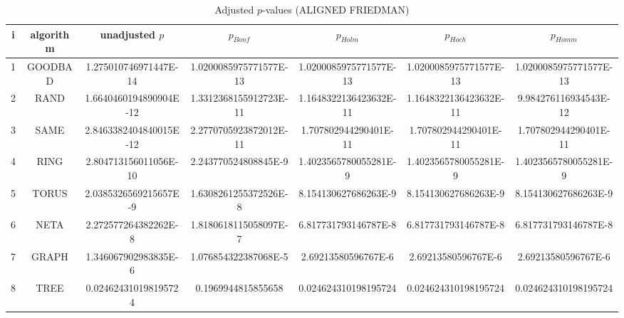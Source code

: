\documentclass[a4paper,10pt]{article}
\begin{document}
\begin{landscape}
\begin{table}[!htp]
\centering\scriptsize
\caption{Adjusted $p$-values (ALIGNED FRIEDMAN)}
\begin{tabular}{ccccccc}
i&algorithm&unadjusted $p$&$p_{Bonf}$&$p_{Holm}$&$p_{Hoch}$&$p_{Homm}$\\
\hline
1& GOODBAD&1.275010746971447E-14&1.0200085975771577E-13&1.0200085975771577E-13&1.0200085975771577E-13&1.0200085975771577E-13\\
2& RAND&1.6640460194890904E-12&1.3312368155912723E-11&1.1648322136423632E-11&1.1648322136423632E-11&9.984276116934543E-12\\
3& SAME&2.8463382404840015E-12&2.2770705923872012E-11&1.707802944290401E-11&1.707802944290401E-11&1.707802944290401E-11\\
4& RING&2.804713156011056E-10&2.243770524808845E-9&1.4023565780055281E-9&1.4023565780055281E-9&1.4023565780055281E-9\\
5& TORUS&2.0385326569215657E-9&1.6308261255372526E-8&8.154130627686263E-9&8.154130627686263E-9&8.154130627686263E-9\\
6& NETA&2.272577264382262E-8&1.8180618115058097E-7&6.817731793146787E-8&6.817731793146787E-8&6.817731793146787E-8\\
7& GRAPH&1.346067902983835E-6&1.076854322387068E-5&2.69213580596767E-6&2.69213580596767E-6&2.69213580596767E-6\\
8& TREE&0.024624310198195724&0.1969944815855658&0.024624310198195724&0.024624310198195724&0.024624310198195724\\
\hline
\end{tabular}
\end{table}


\end{landscape}
\end{document}

